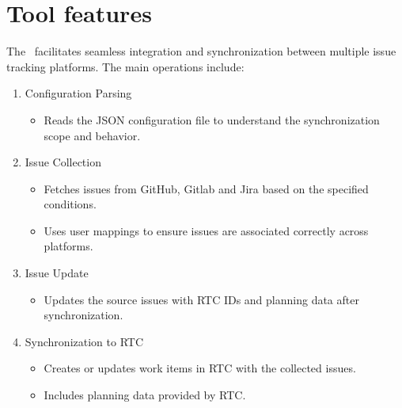 



\hypertarget{tool-features}{%
\section{Tool features}\label{tool-features}}

The \pkg\ facilitates seamless integration and synchronization between multiple 
issue tracking platforms. The main operations include:

\begin{enumerate}
   \item Configuration Parsing
         \begin{itemize}
            \item Reads the JSON configuration file to understand the 
                  synchronization scope and behavior.
         \end{itemize}

   \item Issue Collection
         \begin{itemize}
            \item Fetches issues from GitHub, Gitlab and Jira based on the 
                  specified conditions.
            \item Uses user mappings to ensure issues are associated correctly 
                  across platforms.
         \end{itemize}

   \item Issue Update
         \begin{itemize}
            \item Updates the source issues with RTC IDs and planning data after 
                  synchronization.
         \end{itemize}

   \item Synchronization to RTC
         \begin{itemize}
            \item Creates or updates work items in RTC with the collected issues.
            \item Includes planning data provided by RTC.
         \end{itemize}
\end{enumerate}

